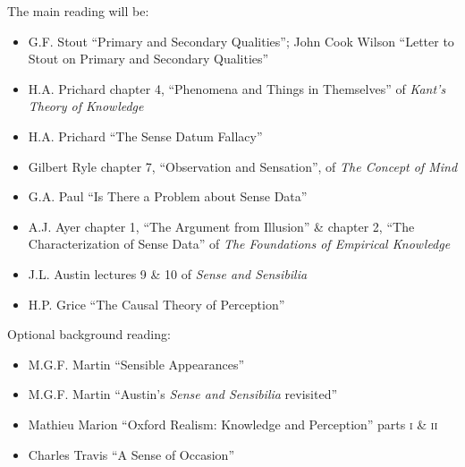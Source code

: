 \documentclass[11pt]{article}
\begin{document}
\noindent The main reading will be:
\begin{itemize}
	\item G.F. Stout ``Primary and Secondary Qualities''; John Cook Wilson ``Letter to Stout on Primary and Secondary Qualities''
	\item H.A. Prichard chapter 4, ``Phenomena and Things in Themselves'' of \emph{Kant's Theory of Knowledge}
	\item H.A. Prichard ``The Sense Datum Fallacy''
	\item Gilbert Ryle chapter 7, ``Observation and Sensation'', of \emph{The Concept of Mind}
	\item G.A. Paul ``Is There a Problem about Sense Data''
	\item A.J. Ayer chapter 1, ``The Argument from Illusion'' \& chapter 2, ``The Characterization of Sense Data'' of \emph{The Foundations of Empirical Knowledge}
	\item J.L. Austin lectures 9 \& 10 of \emph{Sense and Sensibilia}
	\item H.P. Grice ``The Causal Theory of Perception''
\end{itemize}

\noindent Optional background reading:
\begin{itemize}
	\item M.G.F. Martin ``Sensible Appearances''
	\item M.G.F. Martin ``Austin's \emph{Sense and Sensibilia} revisited''
	\item Mathieu Marion ``Oxford Realism: Knowledge and Perception'' parts \textsc{i} \& \textsc{ii}
	\item Charles Travis ``A Sense of Occasion''
\end{itemize}

\end{document}
